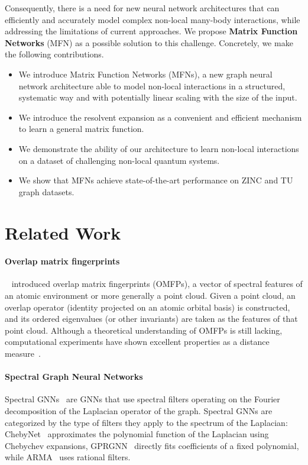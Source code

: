 \documentclass{article} \usepackage{iclr2024_conference,times}
\begin{document}
Consequently, there is a need for new neural network architectures that can efficiently and accurately model complex non-local many-body interactions, while addressing the limitations of current approaches. We propose {\bf Matrix Function Networks} (MFN) as a possible solution to this challenge. Concretely, we make the following contributions.
\vspace{-5pt}
\begin{itemize}
    \item We introduce Matrix Function Networks (MFNs), a new graph neural network architecture able to model non-local interactions in a structured, systematic way and with potentially linear scaling with the size of the input.
    \vspace{-1pt}
    \item We introduce the resolvent expansion as a convenient and efficient mechanism to learn a general matrix function.
    \vspace{-1pt}
    \item We demonstrate the ability of our architecture to learn non-local interactions on a dataset of challenging non-local quantum systems. 
    \item We show that MFNs achieve state-of-the-art performance on ZINC and TU graph datasets.
\end{itemize}

\section{Related Work}

\paragraph{Overlap matrix fingerprints}~\citep{OMFPs2016} introduced overlap matrix fingerprints (OMFPs), a vector of spectral features of an atomic environment or more generally a point cloud. Given a point cloud, an overlap operator (identity projected on an atomic orbital basis) is constructed, and its ordered eigenvalues (or other invariants) are taken as the features of that point cloud. Although a theoretical understanding of OMFPs is still lacking, computational experiments have shown excellent properties as a distance measure~\citep{OMFPs2016, OMFPs2021}.

\paragraph{Spectral Graph Neural Networks}
Spectral GNNs~\citep{WUGNN2021} are GNNs that use spectral filters operating on the Fourier decomposition of the Laplacian operator of the graph. Spectral GNNs are categorized by the type of filters they apply to the spectrum of the Laplacian: ChebyNet~\citep{ChebyConv} approximates the polynomial function of the Laplacian using Chebychev expansions, GPRGNN~\citep{GPRGNN} directly fits coefficients of a fixed polynomial, while ARMA~\citep{ARMA} uses rational filters.
\end{document}
